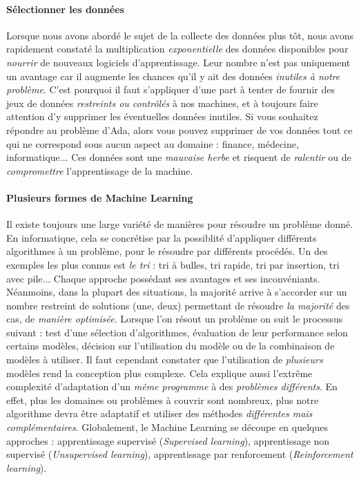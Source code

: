 \paragraph{Sélectionner les données}\label{select_data_ml} Lorsque nous avons abordé le sujet de la collecte des données plus tôt, nous avons rapidement constaté la 
multiplication \emph{exponentielle} des données disponibles pour \emph{nourrir} de nouveaux logiciels d'apprentissage. Leur nombre n'est pas
uniquement un avantage car il augmente les chances qu'il y ait des données \emph{inutiles à notre problème}. C'est pourquoi il faut s'appliquer
d'une part à tenter de fournir des jeux de données \emph{restreints ou contrôlés} à nos machines, et à toujours faire attention d'y supprimer les
éventuelles données inutiles. Si vous souhaitez répondre au problème d'Ada, alors vous pouvez supprimer de vos données tout ce qui ne correspond
sous aucun aspect au domaine : finance, médecine, informatique... Ces données sont une \emph{mauvaise herbe} et risquent de \emph{ralentir} ou de
\emph{compromettre} l'apprentissage de la machine. 

\paragraph{Plusieurs formes de Machine Learning} Il existe toujours une large variété de manières pour résoudre un problème donné. En informatique, cela se concrétise par la possiblité
d'appliquer différents algorithmes à un problème, pour le résoudre par différents procédés. Un des exemples les plus connus est \emph{le tri} : tri à
bulles, tri rapide, tri par insertion, tri avec pile... Chaque approche possédant ses avantages et ses inconvéniants. Néanmoins, dans la plupart des
situations, la majorité arrive à s'accorder sur un nombre restreint de solutions (une, deux) permettant de résoudre \emph{la majorité} des cas, de \emph{manière optimisée}.
Lorsque l'on résout un problème on suit le processus suivant : test d'une sélection d'algorithmes, évaluation de leur performance selon certains
modèles, décision sur l'utilisation du modèle ou de la combinaison de modèles à utiliser. Il faut cependant constater que l'utilisation de \emph{plusieurs}
modèles rend la conception plus complexe. Cela explique aussi l'extrême complexité d'adaptation d'un \emph{même programme} à des \emph{problèmes différents}.
En effet, plus les domaines ou problèmes à couvrir sont nombreux, plus notre algorithme devra être adaptatif et utiliser des méthodes \emph{différentes mais complémentaires}. 
Globalement, le Machine Learning se découpe en quelques approches : apprentissage supervisé (\emph{Supervised learning}), apprentissage non supervisé
(\emph{Unsupervised learning}), apprentissage par renforcement (\emph{Reinforcement learning}).

